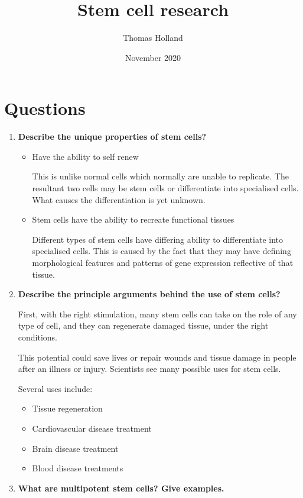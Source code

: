 \documentclass[a4paper]{article}
\title{Stem cell research}
\author{Thomas Holland}
\date{November 2020}
\begin{document}
\maketitle
\section*{Questions}
\begin{enumerate}
    \item \textbf{Describe the unique properties of stem cells? \cite{noauthor_ii._nodate}}
    
\begin{itemize}
    \item Have the ability to self renew

This is unlike normal cells which normally are unable to replicate. The resultant two cells may be stem cells or differentiate into specialised cells. What causes the differentiation is yet unknown. 

    \item Stem cells have the ability to recreate functional tissues
    
Different types of stem cells have differing ability to differentiate into specialised cells. This is caused by the fact that they may have defining morphological features and patterns of gene expression reflective of that tissue.
\end{itemize}

    \item\textbf{ Describe the principle arguments behind the use of stem cells? \cite{noauthor_stem_2018}}

First, with the right stimulation, many stem cells can take on the role of any type of cell, and they can regenerate damaged tissue, under the right conditions.

This potential could save lives or repair wounds and tissue damage in people after an illness or injury. Scientists see many possible uses for stem cells.

Several uses include:
\begin{itemize}
    \item Tissue regeneration
    \item Cardiovascular disease treatment
    \item Brain disease treatment
    \item Blood disease treatments
\end{itemize}
    \item \textbf{What are multipotent stem cells? Give examples. \cite{noauthor_multipotent_nodate}} 
    

\end{enumerate}
\end{document}

